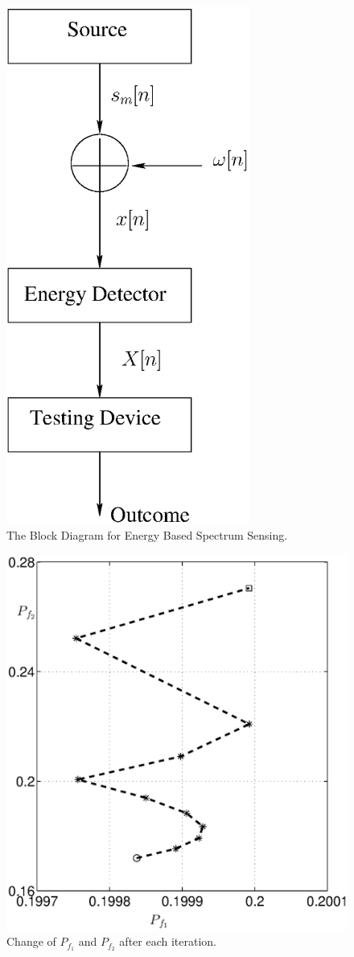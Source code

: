 \documentclass[12pt,journal,a4paper,twoside,onecolumn]{IEEEtran}
\begin{document}
\begin{spacing}{2.5}
\begin{figure}[!t]
\centering
\includegraphics[width=8cm]{fig1.eps}
\caption{The Block Diagram for Energy Based Spectrum Sensing.}
\label{pic: block diagram}
\end{figure}

\begin{figure}[!t]
\centering
\includegraphics[width=12cm]{PFchange.eps}
\caption{Change of $P_{f_1}$ and $P_{f_2}$ after each iteration.}
\label{pic: PFchange}
\end{figure}


\end{spacing}
\end{document}
